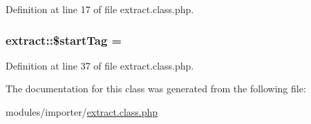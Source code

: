 Definition at line 17 of file extract.\+class.\+php.

\subsubsection[{\texorpdfstring{\$start\+Tag}{$startTag}}]{\setlength{\rightskip}{0pt plus 5cm}extract\+::\$start\+Tag = \textquotesingle{}\textquotesingle{}}\hypertarget{classextract_a3acbe3af3d1b083b33023202a5e05432}{}\label{classextract_a3acbe3af3d1b083b33023202a5e05432}


Definition at line 37 of file extract.\+class.\+php.



The documentation for this class was generated from the following file\+:\begin{DoxyCompactItemize}
\item 
modules/importer/\hyperlink{extract_8class_8php}{extract.\+class.\+php}\end{DoxyCompactItemize}
